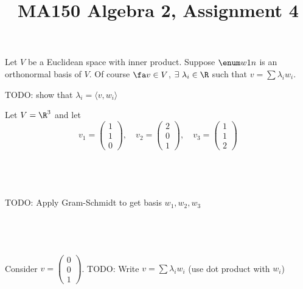 \documentclass[a4paper]{article}
\title{MA150 Algebra 2, Assignment 4}
\begin{document}
\maketitle

\setlength{\parindent}{0em}
\setlength{\parskip}{1em}


Let $V$ be a Euclidean space with inner product. Suppose $\enum w1n$ is an orthonormal basis of $V$. Of course $\fa v \in V$, $\exists\ \lambda_i \in \R$ such that $v = \sum \lambda_i w_i$.

TODO: show that $\lambda_i = \langle v, w_i \rangle$



Let $V = \R^3$ and let $$v_1 = \begin{pmatrix}1\\ 1\\ 0\end{pmatrix}, \quad v_2 = \begin{pmatrix}2\\ 0\\ 1\end{pmatrix}, \quad v_3 = \begin{pmatrix}1\\ 1\\ 2\end{pmatrix}$$

\subsection{~}

TODO: Apply Gram-Schmidt to get basis $w_1, w_2, w_3$

\subsection{~}

Consider $v = \begin{pmatrix}0\\ 0\\ 1\end{pmatrix}$. TODO: Write $v = \sum \lambda_i w_i$ (use dot product with $w_i$)



\subsection{~}
\end{document}

